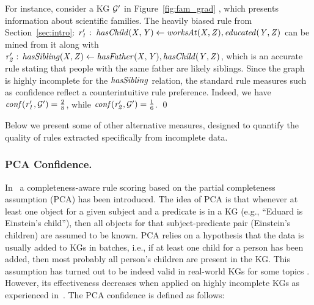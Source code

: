 \begin{example}\label{ex:rulesforgprime}
For instance, consider a KG $\mathcal{G}'$ in Figure~\ref{fig:fam_grad} \cite{carl}, which presents information about scientific families. 
The heavily biased rule from Section~\ref{sec:intro}: $\mathit{r_1':\;hasChild(X,Y)\leftarrow worksAt(X,Z), educated(Y,Z)}$ can be mined from it along with $\mathit{r_2':\,hasSibling(X,Z)\leftarrow hasFather(X,Y),hasChild(Y,Z)}$, which is an accurate rule stating that people with the same father are likely siblings. Since the graph is highly incomplete for the $\mathit{hasSibling}$ relation, the standard rule measures such as confidence reflect a counterintuitive rule preference. Indeed, we have $\mathit{conf(\mathit{r_1',\mathcal{G}'})}=\frac{2}{8}$, while
$\mathit{conf(\mathit{r_2',\mathcal{G}'})}=\frac{1}{6}$. \qed
\end{example}

 Below we present some of other alternative measures, designed 
 to quantify the quality of rules extracted specifically from incomplete data.
 


\subsubsection{PCA Confidence.} In~\cite{amie} a completeness-aware rule scoring based
on the partial completeness assumption (PCA) has been introduced. The idea of PCA is that
whenever at least one object for a given subject and a predicate is in a KG (e.g., ``Eduard
is Einstein's child''), then all objects for that subject-predicate pair (Einstein’s children)
are assumed to be known. PCA relies on a hypothesis that the data is usually
added to KGs in batches, i.e., if at least one child for a person has been added, then most probably
all person's children are present in the KG. This assumption has turned out to be indeed valid in real-world KGs for some topics \cite{amie}. However, its effectiveness decreases when applied on highly incomplete KGs as experienced in~\cite{thinh2018}.
The PCA confidence is defined as follows: 

